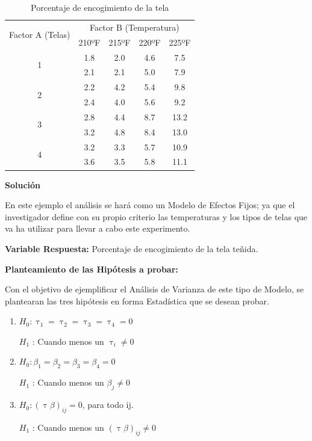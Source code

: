 \documentclass[12pt,letterpaper]{report}
\begin{document}
\begin{table}[htb]
\centering
\begin{tabular}{||c|c|c|c|c||}
\hline
\hline
\multirow{2}{*}{Factor A (Telas)} & \multicolumn{4}{c||}{Factor B (Temperatura)} \\
\cline{2-5}
                   &210ºF&215ºF&220ºF&225ºF \\
\hline
\multirow{2}{*}{1} &1.8&2.0&4.6&7.5 \\
                   &2.1&2.1&5.0&7.9 \\
\hline
\multirow{2}{*}{2} &2.2&4.2&5.4&9.8 \\
                   &2.4&4.0&5.6&9.2 \\
\hline
\multirow{2}{*}{3} &2.8&4.4&8.7&13.2 \\
                   &3.2&4.8&8.4&13.0 \\
\hline
\multirow{2}{*}{4} &3.2&3.3&5.7&10.9 \\
                   &3.6&3.5&5.8&11.1 \\
\hline
\hline

\end{tabular}
\caption{Porcentaje de encogimiento de la tela}
\end{table}
\newpage

\textbf{Solución}

En este ejemplo el análisis se hará como un Modelo de Efectos Fijos; ya que el
investigador define con su propio criterio las temperaturas y los tipos de telas que va ha utilizar para llevar a cabo este experimento.

\textbf{Variable Respuesta:} Porcentaje de encogimiento de la tela teñida.

\textbf{Planteamiento de las Hipótesis a probar:}

Con el objetivo de ejemplificar el Análisis de Varianza de este tipo de Modelo, se plantearan
las tres hipótesis en forma Estadística que se desean probar.
\begin{enumerate}
\item $H_0 : \uptau_1 = \uptau_2 = \uptau_3 = \uptau_4 = 0$

      $H_1$ : Cuando menos un $\uptau_i \not= 0$

\item $H_0 : \beta_1 = \beta_2 = \beta_3 = \beta_4 = 0$

      $H_1$ : Cuando menos un $\beta_j \not= 0$

\item $H_0 : (\uptau\beta)_{ij} = 0$, para todo ij.

      $H_1$ : Cuando menos un $(\uptau\beta)_{ij} \not= 0$
\end{enumerate}
\end{document}
